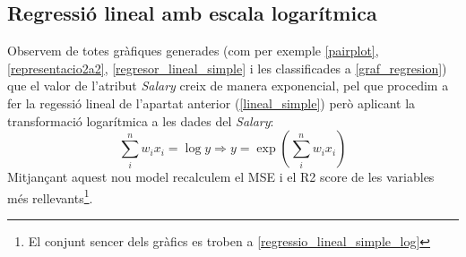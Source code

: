 \documentclass[a4paper, 11pt]{article}
\begin{document}
\subsection{Regressió lineal amb escala logarítmica}\label{tranformacio_loaritmica}
Observem de totes gràfiques generades (com per exemple \textcolor{blue}{\ref{pairplot}}, \textcolor{blue}{\ref{representacio2a2}}, \textcolor{blue}{\ref{regresor_lineal_simple}} i les classificades a \textcolor{blue}{\ref{graf_regresion}}) que el valor de l'atribut \textit{Salary} creix de manera exponencial, pel que procedim a fer la regessió lineal de l'apartat anterior (\textcolor{blue}{\ref{lineal_simple}}) però aplicant la transformació logarítmica a les dades del \textit{Salary}:
$$\sum_{i}^{n} w_i x_i = \log y \Longrightarrow y = \exp\left(\sum_{i}^{n} w_i x_i\right)$$
Mitjançant aquest nou model recalculem el MSE i el R2 score de les variables més rellevants\footnote{El conjunt sencer dels gràfics es troben a \textcolor{blue}{\ref{regressio_lineal_simple_log}}}.
\end{document}
